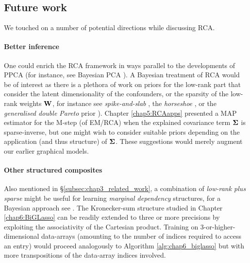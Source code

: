     
    


    
  \subsection*{Future work}
          
    We touched on a number of potential directions while discussing RCA.
    
    \paragraph{Better inference}
    One could enrich the RCA framework in ways parallel to the developments of PPCA (for instance, see Bayesian PCA \citep{Bishop:bayesPCA98}).
    A Bayesian treatment of RCA would be of interest as there is a plethora of work on priors for the low-rank part that consider the latent dimensionality of the confounders, or the sparsity of the low-rank weights $\mathbf{W}$, for instance see \emph{spike-and-slab} \citep{Mohamed:Bayesian12}, the \emph{horseshoe} \citep{Carvalho:horseshoe10}, or the \emph{generalised double Pareto} prior \citep{Armagan:GDP11}).
    Chapter \ref{chap5:RCAapps} presented a MAP estimator for the M-step (of EM/RCA) when the explained covariance term $\mathbf{\Sigma}$ is sparse-inverse, but one might wish to consider suitable priors depending on the application (and thus structure) of $\mathbf{\Sigma}$. These suggestions would merely augment our earlier graphical models.
    
    \paragraph{Other structured composites}
    Also mentioned in \S \ref{subsec:chap3_related_work}, a combination of \emph{low-rank plus sparse} might be useful for learning \emph{marginal dependency} structures, for a Bayesian approach see \citep{Silva:ADMGStructure11}.
    The Kronecker-sum structure studied in Chapter \ref{chap6:BiGLasso} can be readily extended to three or more precisions by exploiting the associativity of the Cartesian product. Training on 3-or-higher-dimensional data-arrays (amounting to the number of indices required to access an entry) would proceed analogously to Algorithm \ref{alg:chap6_biglasso} but with more transpositions of the  data-array indices involved.
        

